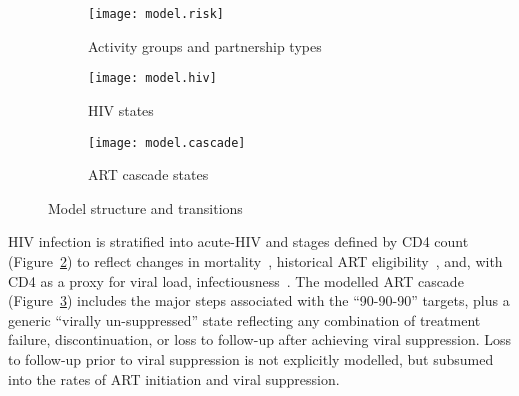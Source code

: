 \begin{figure}
  \begin{subfigure}{\linewidth}
    \texttt{[image: model.risk]}
    \caption{Activity groups and partnership types}
    \label{fig:model.risk}
  \end{subfigure}
  \begin{subfigure}{\linewidth}
    \texttt{[image: model.hiv]}
    \caption{HIV states}
    \label{fig:model.hiv}
  \end{subfigure}
  \begin{subfigure}{\linewidth}
    \texttt{[image: model.cascade]}
    \caption{ART cascade states}
    \label{fig:model.cascade}
  \end{subfigure}
  \caption{Model structure and transitions}
  \label{fig:model}
\end{figure}
\par
HIV infection is stratified into
acute-HIV and stages defined by CD4 count (Figure~\ref{fig:model.hiv})
to reflect changes in mortality~\cite{Mangal2017},
historical ART eligibility~\cite{EswMOH2006,EswMOH2010,EswMOH2015,EswMOH2018},
and, with CD4 as a proxy for viral load, infectiousness~\cite{Boily2009}.
The modelled ART cascade (Figure~\ref{fig:model.cascade})
includes the major steps associated with the ``90-90-90'' targets,
plus a generic ``virally un-suppressed'' state reflecting any combination of
treatment failure, discontinuation, or loss to follow-up after achieving viral suppression.
Loss to follow-up prior to viral suppression is not explicitly modelled,
but subsumed into the rates of ART initiation and viral suppression.

